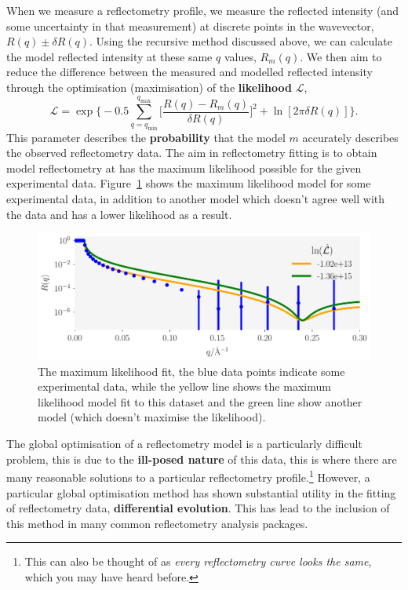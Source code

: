 \documentclass[twoside,symmetric]{tufte-handout}
\begin{document}
When we measure a reflectometry profile, we measure the reflected intensity (and some uncertainty in that measurement) at discrete points in the wavevector, $R(q) \pm \delta R(q)$.
Using the recursive method discussed above, we can calculate the model reflected intensity at these same $q$ values, $R_m(q)$. 
We then aim to reduce the difference between the measured and modelled reflected intensity through the optimisation (maximisation) of the \textbf{likelihood} $\mathcal{L}$, 
%
\begin{equation}
    \mathcal{L} = \exp{\bigg\{-0.5 \sum_{q=q_{\text{min}}}^{q_{\text{max}}} \bigg[\frac{R(q) - R_m(q)}{\delta R(q)}\bigg]^2 + \ln[2\pi \delta R(q)]\bigg\}}.
\end{equation}
%
This parameter describes the \textbf{probability} that the model $m$ accurately describes the observed reflectometry data.
The aim in reflectometry fitting is to obtain model reflectometry at has the maximum likelihood possible for the given experimental data. 
Figure~\ref{fig:likelihood} shows the maximum likelihood model for some experimental data, in addition to another model which doesn't agree well with the data and has a lower likelihood as a result.
%
\begin{figure}
    \includegraphics[width=\textwidth]{likelihood}
    \caption{The maximum likelihood fit, the blue data points indicate some experimental data, while the yellow line shows the maximum likelihood model fit to this dataset and the green line show another model (which doesn't maximise the likelihood).}
    \label{fig:likelihood}
\end{figure}
%

The global optimisation of a reflectometry model is a particularly difficult problem, this is due to the \textbf{ill-posed nature} of this data, this is where there are many reasonable solutions to a particular reflectometry profile.\footnote{This can also be thought of as \emph{every reflectometry curve looks the same}, which you may have heard before.}
However, a particular global optimisation method has shown substantial utility in the fitting of reflectometry data,\cite{varderlee_comparison_2007} \textbf{differential evolution}.\cite{wormington_characterization_1999}
This has lead to the inclusion of this method in many common reflectometry analysis packages.\cite{bjorck_fitting_2011}
\end{document}

